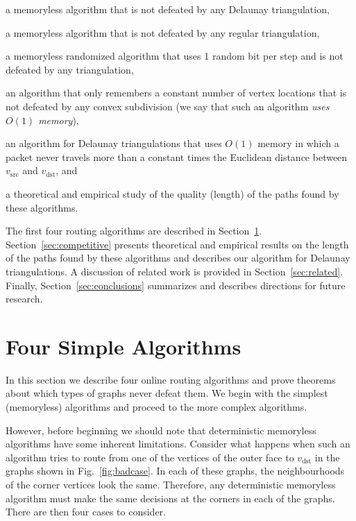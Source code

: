 \documentclass[final]{siamltex}
\newcommand{\seclabel}[1]{\label{sec:#1}}
\newcommand{\secref}[1]{\mbox{Section~\ref{sec:#1}}}
\newcommand{\figref}[1]{\mbox{Fig.~\ref{fig:#1}}}
\newcommand{\vsrc}{v_\mathrm{src}}
\newcommand{\vdest}{v_\mathrm{dst}}
\begin{document}
\begin{remunerate}
\item a memoryless algorithm that is not defeated by any Delaunay
triangulation,

\item a memoryless algorithm that is not defeated by any regular
triangulation,

\item a memoryless randomized algorithm that uses 1 random bit per
step and is not defeated by any triangulation,

\item an algorithm that only remembers a constant number of
vertex locations that is not defeated by any
convex subdivision (we say that such an algorithm \emph{uses $O(1)$
memory}),

\item an algorithm for Delaunay triangulations that uses $O(1)$ memory
in which a packet never travels more than a constant times the
Euclidean distance between $\vsrc$ and $\vdest$, and

\item a theoretical and empirical study of the quality (length) of the
paths found by these algorithms.
\end{remunerate}

The first four routing algorithms are described in
\secref{algorithms}.  \secref{competitive} presents theoretical and
empirical results on the length of the paths found by these algorithms
and describes our algorithm for Delaunay triangulations.  A discussion
of related work is provided in \secref{related}.  Finally,
\secref{conclusions} summarizes and describes directions for future
research.

\section{Four Simple Algorithms}\seclabel{algorithms}

In this section we describe four online routing algorithms and prove
theorems about which types of graphs never defeat them.  We begin with
the simplest (memoryless) algorithms and proceed to the more complex
algorithms.

However, before beginning we should note that deterministic memoryless
algorithms have some inherent limitations.  Consider what happens when
such an algorithm tries to route from one of the vertices of the outer
face to $\vdest$ in the graphs shown in \figref{badcase}.  In each of
these graphs, the neighbourhoods of the corner vertices look the same.
Therefore, any deterministic memoryless algorithm must make the same
decisions at the corners in each of the graphs.  There are then four
cases to consider.
\end{document}
